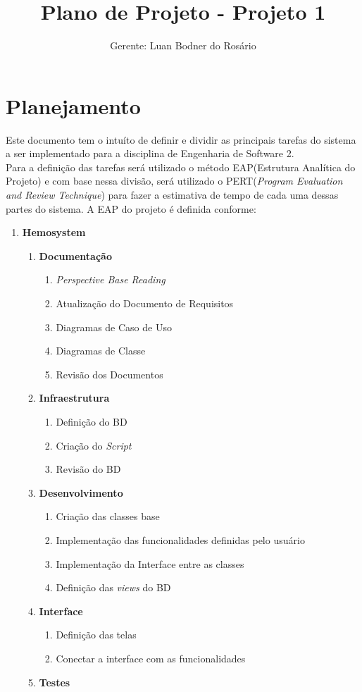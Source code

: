\documentclass[12pt,a4paper,final]{report}
\author{Gerente: Luan Bodner do Rosário}
\title{Plano de Projeto - Projeto 1}
\begin{document}
\maketitle
\section*{Planejamento}

Este documento tem o intuíto de definir e dividir as principais tarefas do sistema a ser implementado para a disciplina de Engenharia de Software 2.\\
Para a definição das tarefas será utilizado o método EAP(Estrutura Analítica do Projeto) e com base nessa divisão, será utilizado o PERT(\textit{Program Evaluation and Review Technique}) para fazer a estimativa de tempo de cada uma dessas partes do sistema.
A EAP do projeto é definida conforme:

\begin{enumerate}
\item \textbf{Hemosystem}
\begin{enumerate}[label*=\arabic*.]
\item \textbf{Documentação}
\begin{enumerate}[label*=\arabic*.]
\item \textit{Perspective Base Reading}
\item Atualização do Documento de Requisitos
\item Diagramas de Caso de Uso
\item Diagramas de Classe
\item Revisão dos Documentos
\end{enumerate}
\item \textbf{Infraestrutura}
\begin{enumerate}[label*=\arabic*.]
\item Definição do BD
\item Criação do \textit{Script}
\item Revisão do BD
\end{enumerate}
\item \textbf{Desenvolvimento}
\begin{enumerate}[label*=\arabic*.]
\item Criação das classes base
\item Implementação das funcionalidades definidas pelo usuário
\item Implementação da Interface entre as classes
\item Definição das \textit{views} do BD
\end{enumerate}
\item \textbf{Interface}
\begin{enumerate}[label*=\arabic*.]
\item Definição das telas
\item Conectar a interface com as funcionalidades
\end{enumerate}
\item \textbf{Testes}

\end{enumerate}
\end{enumerate}
\end{document}
